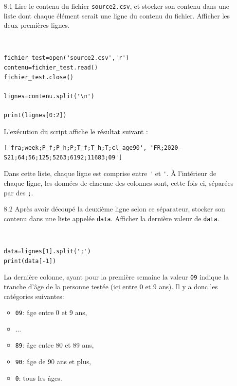 \begin{enumerate}

\item[8.1] Lire le contenu du fichier \verb?source2.csv?, et stocker son contenu dans une liste dont chaque élément serait une ligne du contenu du fichier. Afficher les deux premières lignes.

\begin{solution}~\ \\
\begin{verbatim}
fichier_test=open('source2.csv','r')
contenu=fichier_test.read()
fichier_test.close()

lignes=contenu.split('\n')

print(lignes[0:2])
\end{verbatim}
\end{solution}

L'exécution du script affiche le résultat suivant :
\begin{verbatim}
['fra;week;P_f;P_h;P;T_f;T_h;T;cl_age90', 'FR;2020-S21;64;56;125;5263;6192;11683;09']
\end{verbatim}

Dans cette liste, chaque ligne est comprise entre \verb?'? et \verb?'?. À l'intérieur de chaque ligne, les données de chacune des colonnes sont, cette fois-ci, séparées par des \verb?;?. 

\item[8.2] Après avoir découpé la deuxième ligne selon ce séparateur, stocker son contenu dans une liste appelée \verb?data?. Afficher la dernière valeur de \verb?data?.

\begin{solution}~\ \\
\begin{verbatim}
data=lignes[1].split(';')
print(data[-1])
\end{verbatim}
\end{solution}

La dernière colonne, ayant pour la première semaine la valeur \verb?09? indique la tranche d'âge de la personne testée (ici entre 0 et 9 ans). Il y a donc les catégories suivantes:
\begin{itemize}
 \item \verb?09?: âge entre 0 et 9 ans,
 \item ...
 \item \verb?89?: âge entre 80 et 89 ans,
 \item \verb?90?: âge de 90 ans et plus,
 \item \verb?0?: tous les âges.
\end{itemize}


\end{enumerate}
